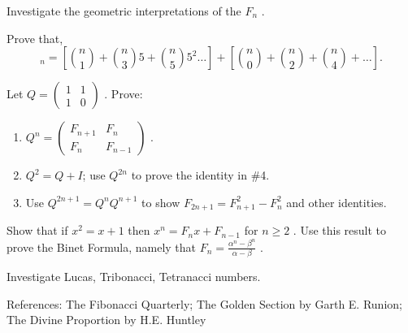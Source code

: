 \documentclass[10pt,]{book}
\theoremstyle{plain}
\theoremstyle{definition}
\theoremstyle{definition}
\theoremstyle{definition}
\theoremstyle{definition}
\numberwithin{equation}{chapter}
\newcommand{\amp}{&}
\begin{document}
\begin{divisionexercise}{5}\hypertarget{exercise-143}{}
\hypertarget{p-1195}{}%
Investigate the geometric interpretations of the \(F_{n}\) .%
\end{divisionexercise}%
\begin{divisionexercise}{6}\hypertarget{exercise-144}{}
\hypertarget{p-1196}{}%
Prove that,%
\begin{equation*}
_{n} = \left\lbrack \binom{n}{1}  + \binom{n}{3} 5 + \binom{n}{5} 5^{2}\ldots \right\rbrack + \left\lbrack \binom{n}{0}  + \binom{n}{2}  + \binom{n}{4}  + \ldots \right\rbrack.
\end{equation*}
%
\end{divisionexercise}%
\begin{divisionexercise}{7}\hypertarget{exercise-145}{}
\hypertarget{p-1197}{}%
Let \(Q =\begin{pmatrix}1 \amp 1 \\ 1 \amp 0\end{pmatrix}\) . Prove: \leavevmode%
\begin{enumerate}[label=(\alph*)]
\item\hypertarget{li-257}{}\hypertarget{p-1198}{}%
\(Q^{n} = \begin{pmatrix} F_{n + 1} \amp F_{n}\\ F_{n} \amp F_{n - 1} \end{pmatrix}\) .%
\item\hypertarget{li-258}{}\hypertarget{p-1199}{}%
\(Q^{2} = Q + I\); use \(Q^{2n}\) to prove the identity in \#4.%
\item\hypertarget{li-259}{}\hypertarget{p-1200}{}%
Use \(Q^{2n + 1} = Q^{n}Q^{n + 1}\) to show \(F_{2n + 1} = F_{n + 1}^{2} - F_{n}^{2}\) and other identities.%
\end{enumerate}
%
\end{divisionexercise}%
\begin{divisionexercise}{8}\hypertarget{exercise-146}{}
\hypertarget{p-1201}{}%
Show that if \(x^{2} = x + 1\) then \(x^{n} = F_{n}x + F_{n - 1}\) for \(n \geq 2\) . Use this result to prove the Binet Formula, namely that \(F_{n} = \frac{\alpha^{n} - \beta^{n}}{\alpha - \beta}\) .%
\end{divisionexercise}%
\begin{divisionexercise}{9}\hypertarget{exercise-147}{}
\hypertarget{p-1202}{}%
Investigate Lucas, Tribonacci, Tetranacci numbers.%
\end{divisionexercise}%
\bigbreak
\hypertarget{p-1203}{}%
References: The Fibonacci Quarterly; The Golden Section by Garth E. Runion; The Divine Proportion by H.E. Huntley%
\typeout{************************************************}
\typeout{************************************************}
\end{document}
